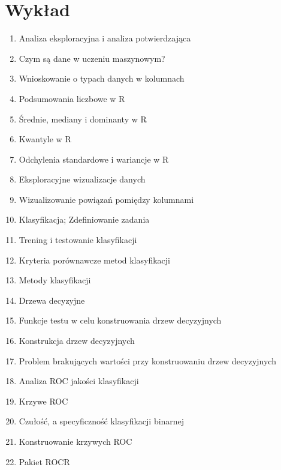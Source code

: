 ﻿\documentclass[11pt]{article}
\begin{document}
    \section{Wykład}
    \begin{enumerate}
        \item Analiza eksploracyjna i analiza potwierdzająca
        \item Czym są dane w uczeniu maszynowym?
        \item Wnioskowanie o typach danych w kolumnach
        \item Podsumowania liczbowe w R
        \item Średnie, mediany i dominanty w R
        \item Kwantyle w R
        \item Odchylenia standardowe i wariancje w R
        \item Eksploracyjne wizualizacje danych
        \item Wizualizowanie powiązań pomiędzy kolumnami
        \item Klasyfikacja; Zdefiniowanie zadania
        \item Trening i testowanie klasyfikacji
        \item Kryteria porównawcze metod klasyfikacji
        \item Metody klasyfikacji
        \item Drzewa decyzyjne
        \item Funkcje testu w celu konstruowania drzew decyzyjnych
        \item Konstrukcja drzew decyzyjnych
        \item Problem brakujących wartości przy konstruowaniu drzew decyzyjnych
        \item Analiza ROC jakości klasyfikacji
        \item Krzywe ROC
        \item Czułość, a specyficzność klasyfikacji binarnej
        \item Konstruowanie krzywych ROC
        \item Pakiet ROCR
    \end{enumerate}
    
\end{document}
